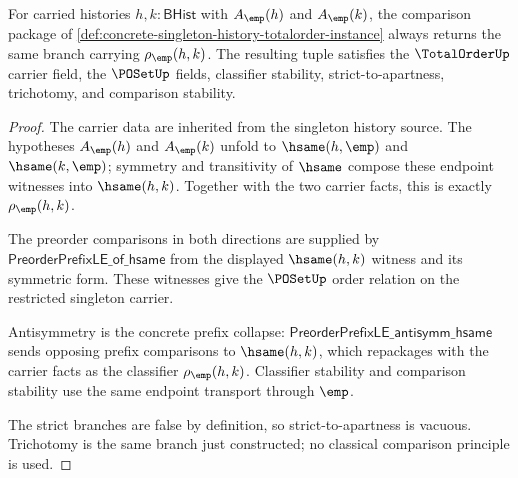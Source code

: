 \begin{theorem}
\label{thm:singleton-history-totalorder-laws}
For carried histories $h,k:\mathsf{BHist}$ with $A_{\emp}(h)$ and
$A_{\emp}(k)$, the comparison package of
\autoref{def:concrete-singleton-history-totalorder-instance} always returns
the same branch carrying $\rho_{\emp}(h,k)$. The resulting tuple satisfies the
$\TotalOrderUp$ carrier field, the $\POSetUp$ fields, classifier stability,
strict-to-apartness, trichotomy, and comparison stability.
\end{theorem}
\begin{proof}
The carrier data are inherited from the singleton history source. The
hypotheses $A_{\emp}(h)$ and $A_{\emp}(k)$ unfold to $\hsame(h,\emp)$ and
$\hsame(k,\emp)$; symmetry and transitivity of $\hsame$ compose these endpoint
witnesses into $\hsame(h,k)$. Together with the two carrier facts, this is
exactly $\rho_{\emp}(h,k)$.

The preorder comparisons in both directions are supplied by
$\mathsf{PreorderPrefixLE\_of\_hsame}$ from the displayed
$\hsame(h,k)$ witness and its symmetric form. These witnesses give the
$\POSetUp$ order relation on the restricted singleton carrier.

Antisymmetry is the concrete prefix collapse:
$\mathsf{PreorderPrefixLE\_antisymm\_hsame}$ sends opposing prefix comparisons
to $\hsame(h,k)$, which repackages with the carrier facts as the classifier
$\rho_{\emp}(h,k)$. Classifier stability and comparison stability use the same
endpoint transport through $\emp$.

The strict branches are false by definition, so strict-to-apartness is vacuous.
Trichotomy is the same branch just constructed; no classical comparison
principle is used.
\end{proof}

